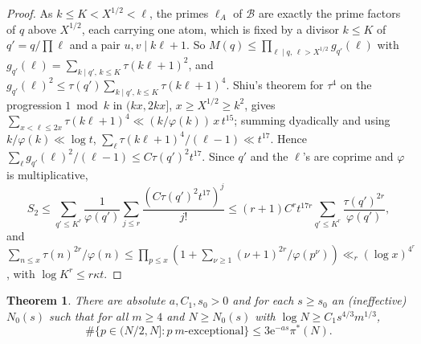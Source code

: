 \documentclass[10pt,reqno]{amsart}
\newtheorem{theorem}{Theorem}[section]
\theoremstyle{definition}
\newcommand{\e}{\mathrm e}
\begin{document}
\begin{proof}
As $k\leq K<X^{1/2}<\ell$, the primes $\ell_A$ of $\mathcal B$ are
exactly the prime factors of $q$ above $X^{1/2}$, each carrying one
atom, which is fixed by a divisor $k\leq K$ of $q'=q/\prod\ell$ and a
pair $u,v\mid k\ell+1$.  So
$M(q)\leq\prod_{\ell\mid q,\,\ell>X^{1/2}}g_{q'}(\ell)$ with
$g_{q'}(\ell)=\sum_{k\mid q',\,k\leq K}\tau(k\ell+1)^2$, and
$g_{q'}(\ell)^2\leq\tau(q')\sum_{k\mid q',\,k\leq K}\tau(k\ell+1)^4$.
Shiu's theorem \cite[Thm.~1]{Shiu} for $\tau^4$ on the progression
$1\bmod k$ in $(kx,2kx]$, $x\geq X^{1/2}\geq k^{2}$, gives
$\sum_{x<\ell\leq2x}\tau(k\ell+1)^4\ll(k/\varphi(k))\,x\,t^{15}$; summing
dyadically and using $k/\varphi(k)\ll\log t$,
$\sum_\ell\tau(k\ell+1)^4/(\ell-1)\ll t^{17}$.  Hence
$\sum_\ell g_{q'}(\ell)^2/(\ell-1)\leq C\tau(q')^2t^{17}$.  Since $q'$
and the $\ell$'s are coprime and $\varphi$ is multiplicative,
\[
 S_2\leq\sum_{q'\leq K^r}\frac1{\varphi(q')}\sum_{j\leq r}
 \frac{(C\tau(q')^2t^{17})^j}{j!}
 \leq(r+1)C^rt^{17r}\sum_{q'\leq K^r}\frac{\tau(q')^{2r}}{\varphi(q')},
\]
and $\sum_{n\leq x}\tau(n)^{2r}/\varphi(n)\leq\prod_{p\leq x}
(1+\sum_{\nu\geq1}(\nu+1)^{2r}/\varphi(p^\nu))\ll_r(\log x)^{4^r}$,
with $\log K^r\leq r\kappa t$.
\end{proof}

\begin{theorem}\label{thm:U13}
There are absolute $a,C_1,s_0>0$ and for each $s\geq s_0$ an
\textup{(}ineffective\textup{)} $N_0(s)$ such that for all $m\geq4$ and
$N\geq N_0(s)$ with $\log N\geq C_1s^{4/3}m^{1/3}$,
\[
 \#\{p\in(N/2,N]:p\ m\text{-exceptional}\}\leq3\e^{-as}\pi^*(N).
\]
\end{theorem}
\end{document}
